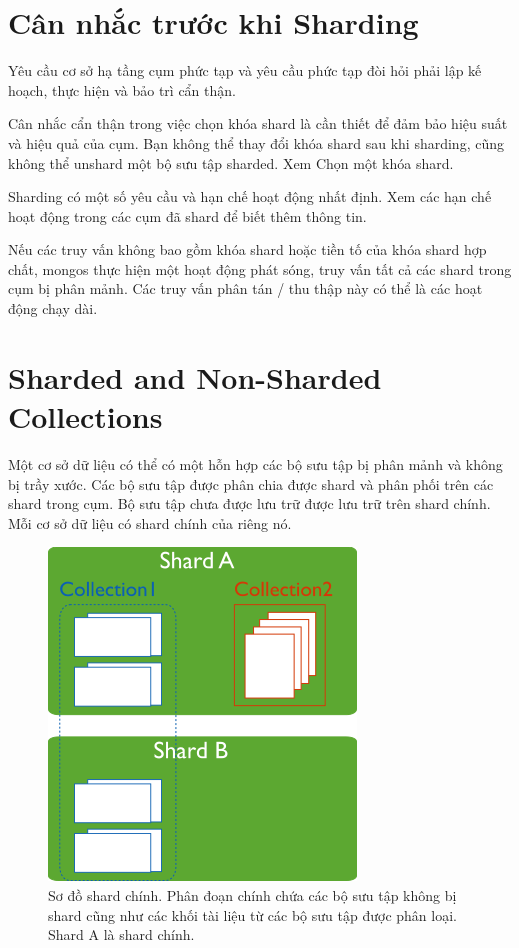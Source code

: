 \section{Cân nhắc trước khi Sharding}
Yêu cầu cơ sở hạ tầng cụm phức tạp và yêu cầu phức tạp đòi hỏi phải lập kế hoạch, thực hiện và bảo trì cẩn thận.

Cân nhắc cẩn thận trong việc chọn khóa shard là cần thiết để đảm bảo hiệu suất và hiệu quả của cụm. Bạn không thể thay đổi khóa shard sau khi sharding, cũng không thể unshard một bộ sưu tập sharded. Xem Chọn một khóa shard.

Sharding có một số yêu cầu và hạn chế hoạt động nhất định. Xem các hạn chế hoạt động trong các cụm đã shard để biết thêm thông tin.

Nếu các truy vấn không bao gồm khóa shard hoặc tiền tố của khóa shard hợp chất, mongos thực hiện một hoạt động phát sóng, truy vấn tất cả các shard trong cụm bị phân mảnh. Các truy vấn phân tán / thu thập này có thể là các hoạt động chạy dài.

\section{Sharded and Non-Sharded Collections}
Một cơ sở dữ liệu có thể có một hỗn hợp các bộ sưu tập bị phân mảnh và không bị trầy xước. Các bộ sưu tập được phân chia được shard và phân phối trên các shard trong cụm. Bộ sưu tập chưa được lưu trữ được lưu trữ trên shard chính. Mỗi cơ sở dữ liệu có shard chính của riêng nó.

\begin{figure}[h!]
\centering
\captionsetup{justification=centering,margin=1cm}
  	\includegraphics[scale=0.5]{charts/sharded-cluster-primary-shard.png}
  \caption{Sơ đồ shard chính. Phân đoạn chính chứa các bộ sưu tập không bị shard cũng như các khối tài liệu từ các bộ sưu tập được phân loại. Shard A là shard chính.}
  \end{figure}

